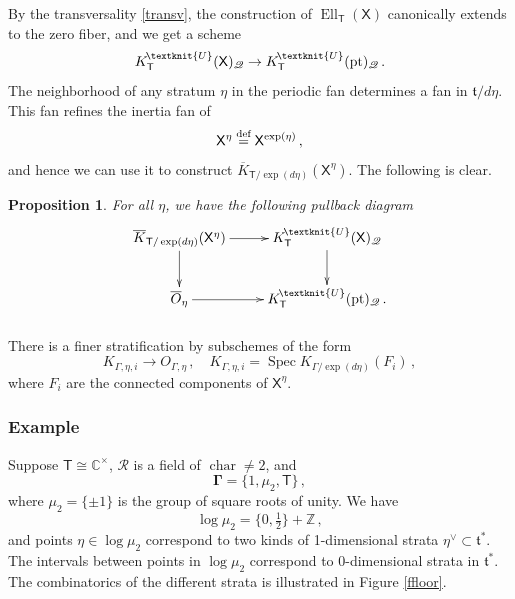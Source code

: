 \documentclass[14pt]{extarticle}
\newcommand{\Kn}{K^{\! \tiny\textknit{U}}}
\newcommand{\Ct}{\mathbb{C}^\times}
\newcommand{\Z}{\mathbb{Z}}
\newcommand{\bT}{\mathsf{T}}
\newcommand{\bX}{\mathsf{X}}
\newcommand{\cR}{\mathscr{R}}
\newcommand{\cQ}{\mathscr{Q}}
\newcommand{\bGamma}{\boldsymbol{\Gamma}}
\newcommand{\ft}{\mathfrak{t}}
\DeclareMathOperator{\Ell}{Ell}
\DeclareMathOperator{\chr}{char}
\DeclareMathOperator{\pt}{pt}
\DeclareMathOperator{\Spec}{Spec}
\newtheorem{Proposition}[Lemma]{Proposition}
\theoremstyle{definition}
\newcommand{\Kbar}{\overline{K}}
\begin{document}
By the transversality \eqref{transv}, the construction of
$\Ell_\bT(\bX)$ canonically extends to the zero fiber, and we get
a scheme
$$
\Kn_\bT(\bX)_\cQ  \to \Kn_\bT(\pt)_\cQ \,.
$$
The neighborhood of any stratum $\eta$ in the periodic fan determines a fan in
$\ft/d\eta$. This fan refines the inertia fan of
$$
\bX^\eta \overset{\tiny\textup{def}} = \bX^{\exp(\eta)} \,, 
$$
and hence we can use it to construct
$\Kbar_{\bT/\exp(d\eta)}(\bX^{\eta})$. The following is clear. 

\begin{Proposition} For all $\eta$, we have the following pullback diagram
  \begin{equation}
    \label{unionKbar}
    \xymatrix{ 
       \Kbar_{\bT/\exp(d\eta)}(\bX^{\eta})  \ar[r] \ar[d] &\Kn_\bT(\bX)_\cQ \ar[d] \\
      \overline{O}_\eta\ar[r] & \Kn_\bT(\pt)_\cQ  \,. 
      } 
    \end{equation}
  \end{Proposition}
 

\subsubsection{}

There is a finer stratification by subschemes of the form
%
\begin{equation}
K_{\Gamma, \eta,  i} \to O_{\Gamma, \eta} \,, \quad
K_{\Gamma, \eta,  i}
= \Spec K_{\Gamma/\exp(d \eta)}(F_i)
\,, \label{strataKbar}
\end{equation}
%
where $F_i$ are the connected components of $\bX^{\eta}$. 



\subsubsection{Example} 

Suppose $\bT\cong \Ct$, $\cR$ is a field of $\chr\ne 2$,  and
$$
\bGamma = \{1, \mu_2, \bT\}\,, 
$$
where $\mu_2=\{\pm 1\}$ is the group of square roots of
unity. We have 
$$
\log \mu_2 = \{0, \tfrac12\}  + \Z \,, 
$$
and points $\eta \in \log \mu_2$ correspond to two kinds of 1-dimensional strata $\eta^\vee \subset
\ft^*$.  The intervals between points in $\log \mu_2$
correspond to $0$-dimensional strata in $\ft^*$. The combinatorics of
the different strata is illustrated in Figure \ref{ffloor}. 
\end{document}
